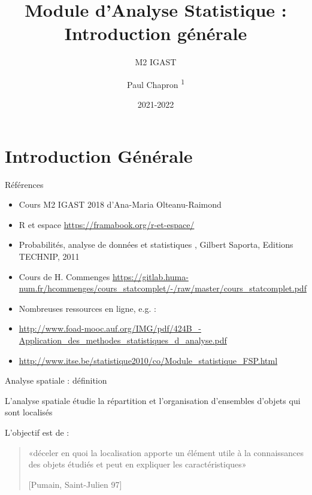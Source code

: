 \documentclass{beamer}
\title{Module d'Analyse Statistique : Introduction générale}
\subtitle{M2 IGAST}
\date{2021-2022}
\author{Paul Chapron \textsuperscript{1} }
\institute{ \textsuperscript{1}LASTIG-UGE-IGN/ENSG}
\begin{document}
\maketitle	

\section{Introduction Générale} 

\begin{frame}{Références}

\begin{itemize}
\item Cours M2 IGAST 2018 d'Ana-Maria Olteanu-Raimond 
\item R et espace \url{https://framabook.org/r-et-espace/}
\item Probabilités, analyse de données et statistiques , Gilbert Saporta, Editions TECHNIP, 2011
\item Cours de H. Commenges \url{https://gitlab.huma-num.fr/hcommenges/cours_statcomplet/-/raw/master/cours_statcomplet.pdf}
\item Nombreuses ressources en ligne, e.g. : 
\item \url{http://www.foad-mooc.auf.org/IMG/pdf/424B_-Application_des_methodes_statistiques_d_analyse.pdf}
\item \url{http://www.itse.be/statistique2010/co/Module_statistique_FSP.html}
\end{itemize}
 

\end{frame}







\begin{frame}{Analyse spatiale : définition} 


L’analyse spatiale étudie la \alert{répartition} et l’\alert{organisation} d’ensembles d’objets qui sont \alert{localisés}  

L’objectif est de : 

\begin{quote}
«déceler en quoi la localisation apporte un élément utile à la connaissances des objets étudiés et peut en expliquer les caractéristiques» 

[Pumain, Saint-Julien 97] 
\end{quote}
\end{frame}
\end{document}
